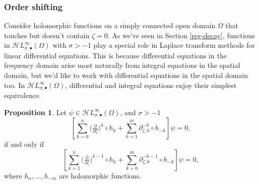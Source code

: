\documentclass{article}
\newcommand{\singexp}[2]{\mathcal{H}L^\infty_{#1, #2}}
\newcommand{\singexpalg}[1]{\singexp{#1}{\bullet}}
\theoremstyle{definition}
\newcommand{\Z}{\mathbb{Z}}
\newcommand{\R}{\mathbb{R}}
\newcommand{\fracderiv}[3]{\partial^{#1}_{#2, #3}}
\newtheorem{prop}[definition]{Proposition}
\begin{document}
\subsubsection{Order shifting}\label{shifting}
Consider holomorphic functions on a simply connected open domain $\Omega$ that touches but doesn't contain $\zeta = 0$. %
As we've seen in Section \ref{reg-decay}, functions in $\singexpalg{\sigma}(\Omega)$ with $\sigma>-1$ play a special role in Laplace transform methods for linear differential equations. This is because differential equations in the frequency domain arise most naturally from integral equations in the spatial domain, but we'd like to work with differential equations in the spatial domain too. In $\singexpalg{\sigma}(\Omega)$, differential and integral equations enjoy their simplest equivalence.
\begin{prop}\label{prop:shifting}
Let $\psi\in\singexpalg{\sigma}(\Omega)$, and $\sigma>-1$
\[ \left[ \sum_{k = 0}^n \big(\tfrac{\partial}{\partial \zeta}\big)^k \circ h_k + \sum_{k = 1}^m \fracderiv{-k}{\zeta}{0} \circ h_{-k} \right] \psi = 0, \]
if and only if
\[ \left[ \sum_{k = 1}^n \big(\tfrac{\partial}{\partial \zeta}\big)^{k-1} \circ h_k + \sum_{k = 0}^m \fracderiv{-k-1}{\zeta}{0} \circ h_{-k} \right] \psi = 0, \]
where $h_n, \ldots, h_{-m}$ are holomorphic functions.
\end{prop}


\end{document}
